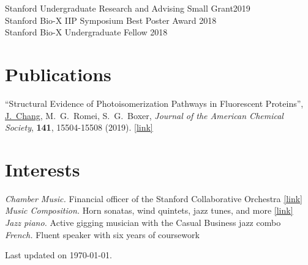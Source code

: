 \documentclass[margin,11pt]{res}
\begin{document}
\begin{resume}
Stanford Undergraduate Research and Advising Small Grant\hfill 2019 \\
Stanford Bio-X IIP Symposium Best Poster Award \hfill 2018 \\
Stanford Bio-X Undergraduate Fellow \hfill 2018

\section{Publications}

% 

\begin{changemargin}{0em}{3em}
    ``Structural Evidence of Photoisomerization Pathways in Fluorescent Proteins'',
    \underline{J.\ Chang}, M.\ G.\ Romei, S.\ G.\ Boxer,
    \textit{Journal of the American Chemical Society},
    \textbf{141},
    15504-15508
    (2019).
    \href{http://dx.doi.org/10.1021/jacs.9b08356}{[link]}
\end{changemargin}

\section{Interests}

\textit{Chamber Music.} Financial officer of the Stanford Collaborative Orchestra \href{https://scor.stanford.edu}{[link]} \\
\textit{Music Composition.} Horn sonatas, wind quintets, jazz tunes, and more \href{https://stanford.edu/~jeffjar/music.html}{[link]} \\
\textit{Jazz piano.} Active gigging musician with the Casual Business jazz combo \\
\textit{French.} Fluent speaker with six years of coursework

\end{resume}

\vfill\hfill{\scriptsize Last updated on \today.}
\end{document}
